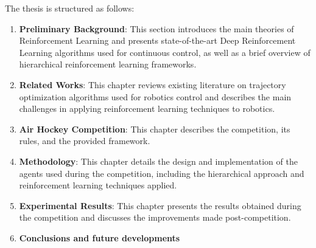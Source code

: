 The thesis is structured as follows:
\begin{enumerate}
    \item \textbf{Preliminary Background}:
    This section introduces the main theories of Reinforcement Learning and presents state-of-the-art Deep Reinforcement Learning algorithms 
    used for continuous control, as well as a brief overview of hierarchical reinforcement learning frameworks.
    \item \textbf{Related Works}:
    This chapter reviews existing literature on trajectory optimization algorithms used for robotics control and describes the main challenges in applying reinforcement learning techniques to robotics.
    \item \textbf{Air Hockey Competition}:
    This chapter describes the competition, its rules, and the provided framework.
    \item \textbf{Methodology}:
    This chapter details the design and implementation of the agents used during the competition, including the hierarchical approach and reinforcement learning techniques applied.
    \item \textbf{Experimental Results}:
    This chapter presents the results obtained during the competition and discusses the improvements made post-competition.
    \item \textbf{Conclusions and future developments}

\end{enumerate}